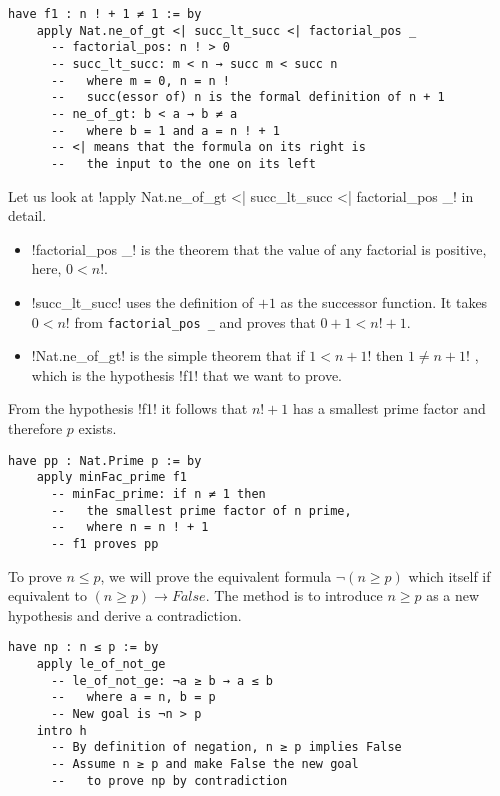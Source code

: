 \begin{Verbatim}[firstnumber=last]
  have f1 : n ! + 1 ≠ 1 := by
    apply Nat.ne_of_gt <| succ_lt_succ <| factorial_pos _
      -- factorial_pos: n ! > 0
      -- succ_lt_succ: m < n → succ m < succ n
      --   where m = 0, n = n !
      --   succ(essor of) n is the formal definition of n + 1
      -- ne_of_gt: b < a → b ≠ a
      --   where b = 1 and a = n ! + 1
      -- <| means that the formula on its right is
      --   the input to the one on its left
\end{Verbatim}

Let us look at 
!apply Nat.ne_of_gt <| succ_lt_succ <| factorial_pos _! in detail.
\begin{itemize}
\item !factorial_pos _! is the theorem that the value of any factorial is positive, here, \UndefineShortVerb{\!}$0<n!$\DefineShortVerb{\!}.

\item !succ_lt_succ! uses the definition of $+1$ as the successor function. It takes 
\UndefineShortVerb{\!}$0<n!$ from \Verb+factorial_pos _+ and proves that $0+1<n!+1$\DefineShortVerb{\!}.

\item !Nat.ne_of_gt! is the simple theorem that if
\UndefineShortVerb{\!}$1<n+1!$ then $1\neq n+1!$ \DefineShortVerb{\!}, which is the hypothesis !f1! that we want to prove.
\end{itemize}


From the hypothesis !f1! it follows that \UndefineShortVerb{\!}$n!+1$\DefineShortVerb{\!} has a smallest prime factor and therefore $p$ exists.

\begin{Verbatim}[firstnumber=last]
  have pp : Nat.Prime p := by
    apply minFac_prime f1
      -- minFac_prime: if n ≠ 1 then
      --   the smallest prime factor of n prime,
      --   where n = n ! + 1
      -- f1 proves pp
\end{Verbatim}

To prove $n\leq p$, we will prove the equivalent formula $\neg (n \geq p)$ which itself if equivalent to $(n\geq p) \rightarrow \mathit{False}$. The method is to introduce $n\geq p$ as a new hypothesis and derive a contradiction.

\begin{Verbatim}[firstnumber=last]
  have np : n ≤ p := by
    apply le_of_not_ge
      -- le_of_not_ge: ¬a ≥ b → a ≤ b
      --   where a = n, b = p
      -- New goal is ¬n > p
    intro h
      -- By definition of negation, n ≥ p implies False
      -- Assume n ≥ p and make False the new goal
      --   to prove np by contradiction
\end{Verbatim}

